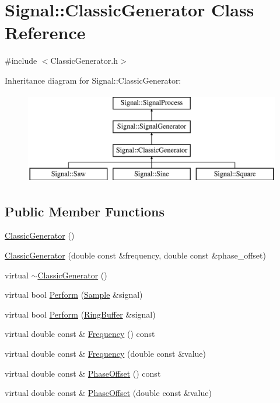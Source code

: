 \hypertarget{class_signal_1_1_classic_generator}{\section{Signal\+:\+:Classic\+Generator Class Reference}
\label{class_signal_1_1_classic_generator}
}


{\ttfamily \#include $<$Classic\+Generator.\+h$>$}

Inheritance diagram for Signal\+:\+:Classic\+Generator\+:\begin{figure}[H]
\begin{center}
\leavevmode
\includegraphics[height=4.000000cm]{class_signal_1_1_classic_generator}
\end{center}
\end{figure}
\subsection*{Public Member Functions}
\begin{DoxyCompactItemize}
\item 
\hyperlink{class_signal_1_1_classic_generator_a7e4478904de77156deccb1515f6985cb}{Classic\+Generator} ()
\item 
\hyperlink{class_signal_1_1_classic_generator_aa8e7631c9a4a72d42bbe560c02ed7358}{Classic\+Generator} (double const \&frequency, double const \&phase\+\_\+offset)
\item 
virtual \hyperlink{class_signal_1_1_classic_generator_a6659174adf402df341e3c0f94564fd37}{$\sim$\+Classic\+Generator} ()
\item 
virtual bool \hyperlink{class_signal_1_1_classic_generator_a4a62f329b9cd64d92b07f53c4d593356}{Perform} (\hyperlink{class_signal_1_1_sample}{Sample} \&signal)
\item 
virtual bool \hyperlink{class_signal_1_1_classic_generator_a308c13baa66020d44c2227bd58db4b4f}{Perform} (\hyperlink{class_signal_1_1_ring_buffer}{Ring\+Buffer} \&signal)
\item 
virtual double const \& \hyperlink{class_signal_1_1_signal_generator_a96af42ee68f94e9b04d034fd68b73ecd}{Frequency} () const 
\item 
virtual double const \& \hyperlink{class_signal_1_1_signal_generator_af83b532bf3ddc3637c2fd7a1dfd095cb}{Frequency} (double const \&value)
\item 
virtual double const \& \hyperlink{class_signal_1_1_signal_generator_ac2538ec946f001e394d2416fda698d1c}{Phase\+Offset} () const 
\item 
virtual double const \& \hyperlink{class_signal_1_1_signal_generator_ac6a103ff72beaa338f6d18c812522d78}{Phase\+Offset} (double const \&value)
\end{DoxyCompactItemize}
